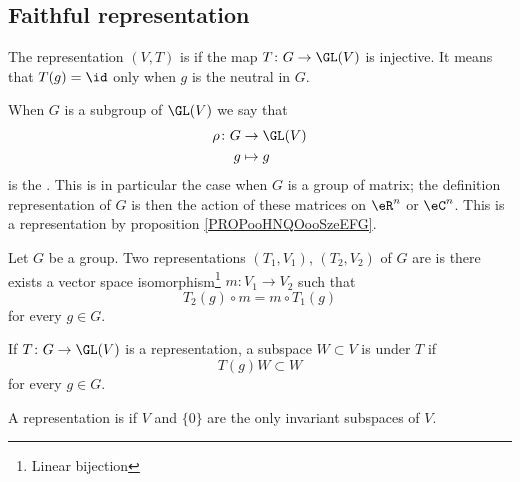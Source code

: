 \subsection{Faithful representation}

\begin{definition}      \label{DEFooAFSAooGDSDBb}
    The representation \( (V,T)\) is  if the map \( T\colon G\to \GL(V)\) is injective. It means that \( T(g)=\id\) only when \( g\) is the neutral in \( G\).
\end{definition}

When \( G\) is a subgroup of \( \GL(V)\) we say that
\begin{equation}
    \begin{aligned}
        \rho\colon G&\to \GL(V) \\
        g&\mapsto g 
    \end{aligned}
\end{equation}
is the . This is in particular the case when \( G\) is a group of matrix; the definition representation of \( G\) is then the action of these matrices on \( \eR^n\) or \( \eC^n\). This is a representation by proposition \ref{PROPooHNQOooSzeEFG}.

\begin{definition}
    Let \( G\) be a group. Two representations \( (T_1,V_1)\), \( (T_2,V_2)\) of \( G\) are  is there exists a vector space isomorphism\footnote{Linear bijection} \( m\colon V_1\to V_2\) such that
    \begin{equation}
        T_2(g)\circ m=m\circ T_1(g)
    \end{equation}
    for every \( g\in G\).
\end{definition}

\begin{definition}
    If \( T\colon G\to \GL(V)\) is a representation, a subspace \( W\subset V\) is  under \( T\) if
    \begin{equation}
        T(g)W\subset W
    \end{equation}
    for every \( g\in G\).

    A representation is  if \( V\) and \( \{ 0 \}\) are the only invariant subspaces of \( V\).
\end{definition}


